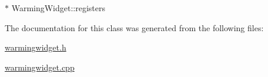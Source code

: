 {$\ast$ Warming\+Widget\+::{\texorpdfstring{registers}{registers}}\hspace{0.3cm}{\ttfamily [private]}}\hypertarget{classWarmingWidget_a83bc5e6ef3f7679874a3074a750266a9}{}\label{classWarmingWidget_a83bc5e6ef3f7679874a3074a750266a9}


The documentation for this class was generated from the following files\+:\begin{DoxyCompactItemize}
\item 
\hyperlink{warmingwidget_8h}{warmingwidget.\+h}\item 
\hyperlink{warmingwidget_8cpp}{warmingwidget.\+cpp}\end{DoxyCompactItemize}
\newpage